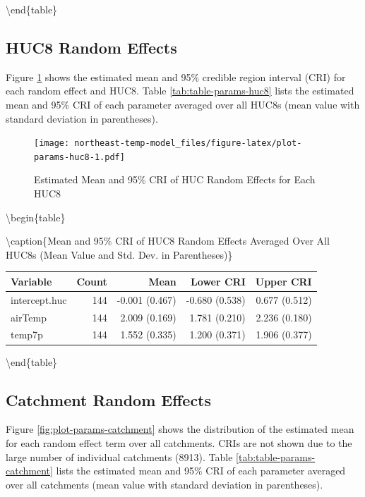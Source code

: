 \documentclass[
]{book}
\begin{document}
\textbackslash end\{table\}

\subsection{HUC8 Random Effects}\label{huc8-random-effects}

Figure \ref{fig:plot-params-huc8} shows the estimated mean and 95\% credible region interval (CRI) for each random effect and HUC8. Table \ref{tab:table-params-huc8} lists the estimated mean and 95\% CRI of each parameter averaged over all HUC8s (mean value with standard deviation in parentheses).

\begin{figure}
\centering
\texttt{[image: northeast-temp-model\_files/figure-latex/plot-params-huc8-1.pdf]}
\caption{\label{fig:plot-params-huc8}Estimated Mean and 95\% CRI of HUC Random Effects for Each HUC8}
\end{figure}

\textbackslash begin\{table\}

\textbackslash caption\{\label{tab:table-params-huc8}Mean and 95\% CRI of HUC8 Random Effects Averaged Over All HUC8s (Mean Value and Std. Dev. in Parentheses)\}
\centering

\begin{tabular}[t]{l|r|r|r|r}
\hline
Variable & Count & Mean & Lower CRI & Upper CRI\\
\hline
intercept.huc & 144 & -0.001 (0.467) & -0.680 (0.538) & 0.677 (0.512)\\
\hline
airTemp & 144 & 2.009 (0.169) & 1.781 (0.210) & 2.236 (0.180)\\
\hline
temp7p & 144 & 1.552 (0.335) & 1.200 (0.371) & 1.906 (0.377)\\
\hline
\end{tabular}

\textbackslash end\{table\}

\subsection{Catchment Random Effects}\label{catchment-random-effects-1}

Figure \ref{fig:plot-params-catchment} shows the distribution of the estimated mean for each random effect term over all catchments. CRIs are not shown due to the large number of individual catchments (8913). Table \ref{tab:table-params-catchment} lists the estimated mean and 95\% CRI of each parameter averaged over all catchments (mean value with standard deviation in parentheses).
\end{document}
